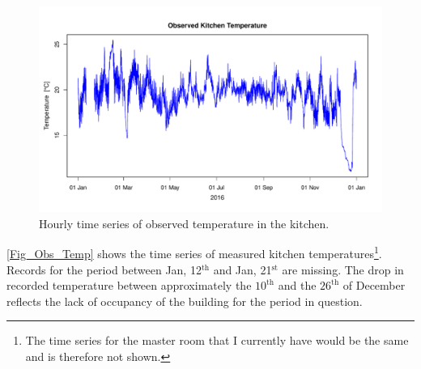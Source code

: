 \documentclass[a4paper, 12pt]{article}
\begin{document}
\begin{figure}
\centering
\includegraphics[scale=0.63]{Temperatures/Observed/Obs_Kitch}
\caption{Hourly time series of observed temperature in the kitchen. }
\label{Fig_Obs_Temp}
\end{figure}

\autoref{Fig_Obs_Temp} shows the time series of measured kitchen temperatures\footnote{The time series for the master room that I currently have would be the same and is therefore not shown.}. Records for the period between Jan, 12$^\text{th}$ and Jan, 21$^\text{st}$ are missing.
The drop in recorded temperature between approximately the $10^\text{th}$ and the $26^\text{th}$ of December reflects the lack of occupancy of the building for the period in question. 

\end{document}
